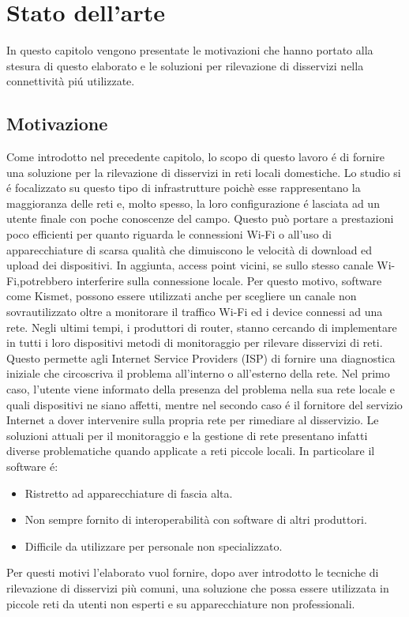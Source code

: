 \chapter{Stato dell'arte}
In questo capitolo vengono presentate le motivazioni che hanno portato alla stesura di questo elaborato e le soluzioni per rilevazione di disservizi nella connettivit\`a pi\'u utilizzate.

\section{Motivazione}
Come introdotto nel precedente capitolo, lo scopo di questo lavoro \'e di fornire una soluzione per la rilevazione di disservizi in reti locali domestiche.
Lo studio si \'e focalizzato su questo tipo di infrastrutture poich\`e esse rappresentano la maggioranza delle reti e, molto spesso, la loro configurazione \'e  lasciata ad un utente finale con poche conoscenze del campo.
Questo pu\`o portare a prestazioni poco efficienti per quanto riguarda le connessioni Wi-Fi o all'uso di apparecchiature di scarsa qualit\`a che dimuiscono le velocit\`a di download ed upload dei dispositivi.
In aggiunta, access point vicini, se sullo stesso canale Wi-Fi,potrebbero interferire sulla connessione locale.
Per questo motivo, software come Kismet\cite{kismet}, possono essere utilizzati anche per scegliere un canale non sovrautilizzato oltre a monitorare il traffico Wi-Fi ed i device connessi ad una rete.
Negli ultimi tempi, i produttori di router, stanno cercando di implementare in tutti i loro dispositivi metodi di monitoraggio per rilevare disservizi di reti.
Questo permette agli Internet Service Providers (ISP) di fornire una diagnostica iniziale che circoscriva il problema all'interno o all'esterno della rete.
Nel primo caso, l'utente viene informato della presenza del problema nella sua rete locale e quali dispositivi ne siano affetti, mentre nel secondo caso \'e il fornitore del servizio Internet a dover intervenire sulla propria rete per rimediare al disservizio.
Le soluzioni attuali per il monitoraggio e la gestione di rete presentano infatti diverse problematiche quando applicate a reti piccole locali.
\newpage
In particolare il software \'e:
\begin{itemize}
	\item Ristretto ad apparecchiature di fascia alta.
	\item Non sempre fornito di interoperabilit\`a con software di altri produttori.
	\item Difficile da utilizzare per personale non specializzato.
\end{itemize}

Per questi motivi l'elaborato vuol fornire, dopo aver introdotto le tecniche di rilevazione di disservizi pi\`u comuni, una soluzione che possa essere utilizzata in piccole reti da utenti non esperti e su apparecchiature non professionali.
